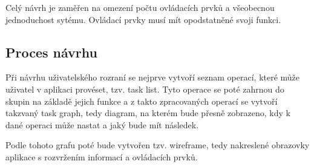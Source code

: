Celý návrh je zaměřen na omezení počtu ovládacích prvků a všeobecnou jednoduchost sytému. Ovládací prvky musí mít opodstatněné svoji funkci.

\subsection{Proces návrhu}
Při návrhu uživatelského rozraní se nejprve vytvoří seznam operací, které může uživatel v aplikaci provéset, tzv. task list. Tyto operace se poté zahrnou do skupin na základě jejich funkce a z takto zpracovaných operací se vytvoří takzvaný task graph, tedy diagram, na kterém bude přesně zobrazeno, kdy k dané operaci může nastat a jaký bude mít následek.

Podle tohoto grafu poté bude vytvořen tzv. wireframe, tedy nakreslené obrazovky aplikace s rozvržením informací a ovládacích prvků.

